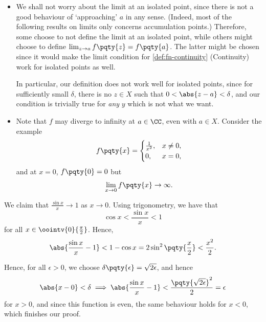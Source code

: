\begin{remark}
    \begin{itemize}
        \item We shall not worry about the limit at an isolated point, since there is not a good behaviour of `approaching' \(a\) in any sense. (Indeed, most of the following results on limits only concerns accumulation points.) Therefore, some choose to not define the limit at an isolated point, while others might choose to define \(\lim_{z \to a} f\pqty{z} = f\pqty{a}\). The latter might be chosen since it would make the limit condition for \autoref{def:fn-continuity} (Continuity) work for isolated points as well.
        
        In particular, our definition does not work well for isolated points, since for sufficiently small \(\delta\), there is no \(z \in X\) such that \(0 < \abs{z - a} < \delta\), and our condition is trivially true for \emph{any} \(y\) which is not what we want.

        \item Note that \(f\) may diverge to infinity at \(a \in \CC\), even with \(a \in X\). Consider the example
        \[
            f\pqty{x} = \begin{cases}
                \frac{1}{x^2}, & x \neq 0, \\
                0, & x = 0,
            \end{cases}  
        \]
        and at \(x = 0\), \(f\pqty{0} = 0\) but
        \[
            \lim_{x \to 0} f\pqty{x} \to \infty.
        \]
    \end{itemize}
\end{remark}

\begin{example}
    \label{ex:sin-x-x-limit}%
    We claim that \(\frac{\sin x}{x} \to 1\) as \(x \to 0\). Using trigonometry, we have that
    \[
        \cos x < \frac{\sin x}{x} < 1
    \]
    for all \(x \in \oointv{0}{\frac{\pi}{2}}\). Hence,
    \[
        \abs{\frac{\sin x}{x} - 1} < 1 - \cos x = 2 \sin^2 \pqty{\frac{x}{2}} < \frac{x^2}{2}.
    \]

    Hence, for all \(\epsilon > 0\), we choose \(\delta\pqty{\epsilon} = \sqrt{2\epsilon}\), and hence
    \[
        \abs{x - 0} < \delta \implies \abs{\frac{\sin x}{x} - 1} < \frac{\pqty{\sqrt{2 \epsilon}}^2}{2} = \epsilon
    \]
    for \(x > 0\), and since this function is even, the same behaviour holds for \(x < 0\), which finishes our proof.
\end{example}

